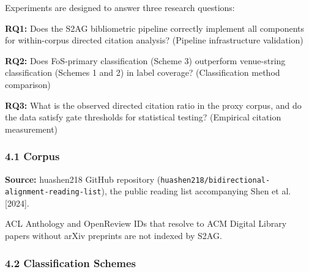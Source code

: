 
Experiments are designed to answer three research questions:

\textbf{RQ1:} Does the S2AG bibliometric pipeline correctly implement all components for within-corpus directed citation analysis? (Pipeline infrastructure validation)

\textbf{RQ2:} Does FoS-primary classification (Scheme 3) outperform venue-string classification (Schemes 1 and 2) in label coverage? (Classification method comparison)

\textbf{RQ3:} What is the observed directed citation ratio in the proxy corpus, and do the data satisfy gate thresholds for statistical testing? (Empirical citation measurement)

\subsubsection{4.1 Corpus}

\textbf{Source:} huashen218 GitHub repository (\texttt{huashen218/bidirectional-alignment-reading-list}), the public reading list accompanying Shen et al. [2024].

\begin{table}[htbp]
\centering
{}
\end{table}

ACL Anthology and OpenReview IDs that resolve to ACM Digital Library papers without arXiv preprints are not indexed by S2AG.

\subsubsection{4.2 Classification Schemes}

\begin{table}[htbp]
\centering
{}
\end{table}


